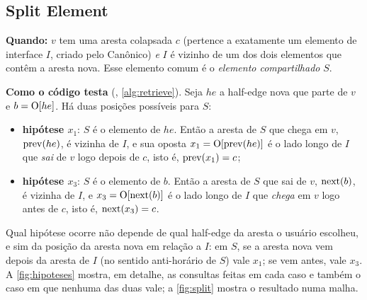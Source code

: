 \subsection{Split Element}
\label{sec:split}

\textbf{Quando:} $v$ tem uma aresta colapsada $c$ (pertence a exatamente um elemento de interface $I$, criado pelo
Canônico) \emph{e} $I$ é vizinho de um dos dois elementos que contêm a aresta nova. Esse elemento comum é o
\emph{elemento compartilhado} $S$.

\textbf{Como o código testa} (, \cref{alg:retrieve}). Seja $he$ a half-edge nova que parte
de $v$ e $b=\mathrm{O}[he]$. Há duas posições possíveis para $S$:
\begin{itemize}
\item \textbf{hipótese $x_1$}: $S$ é o elemento de $he$. Então a aresta de $S$ que chega em $v$, $\mathrm{prev}(he)$, é vizinha
de $I$, e sua oposta $x_1=\mathrm{O}[\mathrm{prev}(he)]$ é o lado longo de $I$ que \emph{sai} de $v$ logo depois de $c$, isto é,
$\mathrm{prev}(x_1)=c$;
\item \textbf{hipótese $x_3$}: $S$ é o elemento de $b$. Então a aresta de $S$ que sai de $v$, $\mathrm{next}(b)$, é vizinha de
$I$, e $x_3=\mathrm{O}[\mathrm{next}(b)]$ é o lado longo de $I$ que \emph{chega} em $v$ logo antes de $c$, isto é, $\mathrm{next}(x_3)=c$.
\end{itemize}
Qual hipótese ocorre não depende de qual half-edge da aresta o usuário escolheu, e sim da posição da aresta nova em
relação a $I$: em $S$, se a aresta nova vem depois da aresta de $I$ (no sentido anti-horário de $S$) vale $x_1$; se vem
antes, vale $x_3$. A \cref{fig:hipoteses} mostra, em detalhe, as consultas feitas em cada caso e também o caso em que
nenhuma das duas vale; a \cref{fig:split} mostra o resultado numa malha.

\newcommand{\hipbase}[1]{%
  \filldraw[cefill] (-2.8,0.6) -- (0,0) -- (0,2.4) -- (-2.8,2.4) -- cycle;
  \filldraw[cefill] (-2.8,-2.4) -- (0,-2.4) -- (0,0) -- (-2.8,-0.6) -- cycle;
  \filldraw[cefill] (0,0) -- (2.6,0) -- (2.6,2.4) -- (0,2.4) -- cycle;
  \filldraw[cefill] (0,-2.4) -- (2.6,-2.4) -- (2.6,0) -- (0,0) -- cycle;
  \filldraw[iefill] (-2.8,-0.6) -- (0,0) -- (-2.8,0.6) -- cycle;
  \draw[white, line width=1.2pt] (-2.8,-0.55) -- (-2.8,0.55);
  \draw[orange!55!black, dashed, line width=0.45pt] (-2.8,-0.6) -- (-2.8,0.6);
  \node[font=\footnotesize\bfseries, text=orange!40!black] at (-2.35,0) {$I$};
  #1
  \node[vcol, minimum size=0.32cm] at (0,0) {};
  \node[font=\scriptsize] at (0.28,-0.22) {$v$};
}
\newcommand{\hipc}[2]{%
  \draw[red!70!black, line width=0.4pt] (0.05,0.03*#2) -- (#1,0.5*#2);
  \node[font=\scriptsize, text=red!70!black, anchor=west, align=left] at (#1,0.5*#2) {$c$ (colapsada,\\ de $v$ para $v$)};
}

